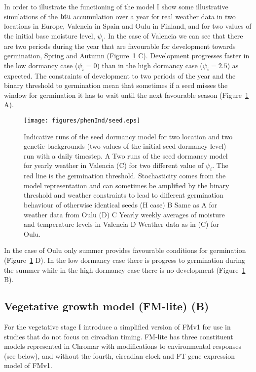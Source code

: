 In order to illustrate the functioning of the model I show some illustrative
simulations of the $\mathrm{htu}$ accumulation over a year for real weather data in
two locations in Europe, Valencia in Spain and Oulu in Finland, and for two
values of the initial base moisture level, $\psi_i$. In the case of Valencia we
can see that there are two periods during the year that are favourable for
development towards germination, Spring and Autumn (Figure~\ref{fig:seedInd}
C). Development progresses faster in the low dormancy case ($\psi_i=0$) than in
the high dormancy case ($\psi_i=2.5$) as expected. The constraints of
development to two periods of the year and the binary threshold to germination
mean that sometimes if a seed misses the window for germination it has to wait
until the next favourable season (Figure~\ref{fig:seedInd} A).
\begin{figure}[tb]
  \centering
  \texttt{[image: figures/phenInd/seed.eps]}
  \caption{Indicative runs of the seed dormancy model for two location and two
    genetic backgrounds (two values of the initial seed dormancy level) run with
    a daily timestep. A Two runs of the seed dormancy model for yearly weather
    in Valencia (C) for two different value of $\psi_i$. The red line is the
    germination threshold. Stochasticity comes from the model representation and
    can sometimes be amplified by the binary threshold and weather constraints
    to lead to different germination behaviour of otherwise identical seeds (H
    case) B Same as A for weather data from Oulu (D) C Yearly weekly averages of
    moisture and temperature levels in Valencia D Weather data as in (C) for
    Oulu.  }
  \label{fig:seedInd}
\end{figure}

In the case of Oulu only summer provides favourable conditions for germination
(Figure~\ref{fig:seedInd} D). In the low dormancy case there is progress to
germination during the summer while in the high dormancy case there is no
development (Figure~\ref{fig:seedInd} B).

\subsection{Vegetative growth model (FM-lite) (B)}
\label{subsec:fm-lite}
For the vegetative stage I introduce a simplified version of FMv1
\citep{chew_multiscale_2014} for use in studies that do not focus on circadian
timing. FM-lite has three constituent models represented in Chromar with
modifications to environmental responses (see below), and without the fourth,
circadian clock and FT gene expression model of FMv1.

